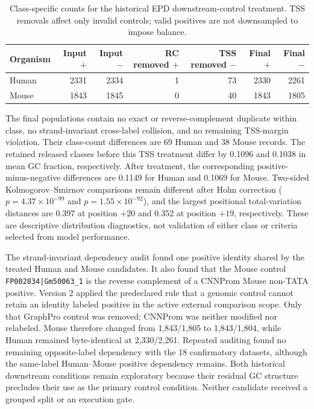 \begin{table}[htbp]
  \centering
  \caption{Class-specific counts for the historical EPD downstream-control treatment. TSS removals affect only invalid controls; valid positives are not downsampled to impose balance.}
  \label{tab:results-epd-downstream-treatment}
  \begin{tabular}{lrrrrrr}
    \toprule
    Organism & Input $+$ & Input $-$ & RC removed $+$ & TSS removed $-$ & Final $+$ & Final $-$ \\
    \midrule
    Human & 2331 & 2334 & 1 & 73 & 2330 & 2261 \\
    Mouse & 1843 & 1845 & 0 & 40 & 1843 & 1805 \\
    \bottomrule
  \end{tabular}
\end{table}

The final populations contain no exact or reverse-complement duplicate within
class, no strand-invariant cross-label collision, and no remaining TSS-margin
violation. Their class-count differences are 69 Human and 38 Mouse records.
The retained released classes before this TSS treatment differ by 0.1096 and
0.1038 in mean GC fraction, respectively. After treatment, the corresponding
positive-minus-negative differences are 0.1149 for Human and 0.1069 for Mouse.
Two-sided Kolmogorov--Smirnov comparisons remain different after Holm
correction ($p=4.37\times10^{-99}$ and $p=1.55\times10^{-92}$), and the largest
positional total-variation distances are 0.397 at position $+20$ and 0.352 at
position $+19$, respectively. These are descriptive distribution diagnostics,
not validation of either class or criteria selected from model performance.

The strand-invariant dependency audit found one positive identity shared by
the treated Human and Mouse candidates. It also found that the Mouse control
\texttt{FP002834|Gm50063\_1} is the reverse complement of a CNNProm Mouse
non-TATA positive. Version 2 applied the predeclared rule that a genomic control
cannot retain an identity labeled positive in the active external comparison
scope. Only that GraphPro control was removed; CNNProm was neither modified nor
relabeled. Mouse therefore changed from 1,843/1,805 to 1,843/1,804, while Human
remained byte-identical at 2,330/2,261. Repeated auditing found no remaining
opposite-label dependency with the 18 confirmatory datasets, although the
same-label Human--Mouse positive dependency remains. Both historical downstream
conditions remain exploratory because their residual GC structure precludes
their use as the primary control condition. Neither candidate received a
grouped split or an execution gate.

